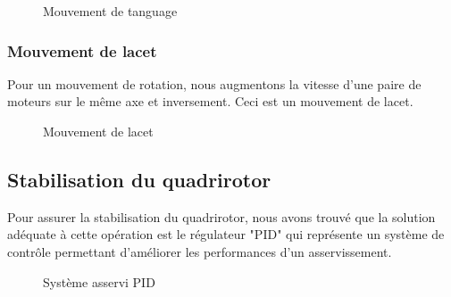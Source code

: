 \begin{figure}[H] 
\begin{center}
	\centering
\end{center}
\caption{Mouvement de tanguage}
\end{figure}

\subsubsection{Mouvement de lacet}
Pour un mouvement de rotation, nous augmentons la vitesse d'une paire de moteurs sur le même axe et inversement. Ceci est un mouvement de lacet.
\begin{figure} [H]
\begin{center}
\end{center}
\caption{Mouvement de lacet}	
\end{figure}
\subsection {Stabilisation du quadrirotor}
Pour assurer la stabilisation du quadrirotor, nous avons trouvé que la solution adéquate à cette opération est le régulateur "PID" qui représente un système de contrôle permettant d’améliorer les performances d'un asservissement\cite{Wikipideab}.
\begin{figure}[H] 
\begin{center}
	\centering
\end{center}
\caption{Système asservi PID}
\end{figure}

